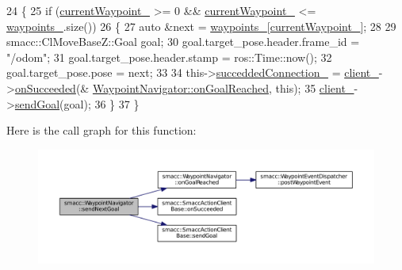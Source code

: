 \begin{DoxyCode}
24 \{
25   \textcolor{keywordflow}{if} (\hyperlink{classsmacc_1_1WaypointNavigator_a9a0102946593081338f7bd259f4670bc}{currentWaypoint\_} >= 0 && \hyperlink{classsmacc_1_1WaypointNavigator_a9a0102946593081338f7bd259f4670bc}{currentWaypoint\_} <= 
      \hyperlink{classsmacc_1_1WaypointNavigator_a59d691f2177430c407b8e27df07552e9}{waypoints\_}.size())
26   \{
27     \textcolor{keyword}{auto} &next = \hyperlink{classsmacc_1_1WaypointNavigator_a59d691f2177430c407b8e27df07552e9}{waypoints\_}[\hyperlink{classsmacc_1_1WaypointNavigator_a9a0102946593081338f7bd259f4670bc}{currentWaypoint\_}];
28 
29     smacc::ClMoveBaseZ::Goal goal;
30     goal.target\_pose.header.frame\_id = \textcolor{stringliteral}{"/odom"};
31     goal.target\_pose.header.stamp = ros::Time::now();
32     goal.target\_pose.pose = next;
33 
34     this->\hyperlink{classsmacc_1_1WaypointNavigator_a932d5378c3ef5bd4e8e3152ac657112f}{succeddedConnection\_} = \hyperlink{classsmacc_1_1WaypointNavigator_a2bdb0d4aea851d877fcb20e6d0897bb8}{client\_}->\hyperlink{classsmacc_1_1SmaccActionClientBase_ae84ce50f0bdd42c5d32a631b4e9b8b6a}{onSucceeded}(&
      \hyperlink{classsmacc_1_1WaypointNavigator_ae60d62eec927560048258a4b8f355506}{WaypointNavigator::onGoalReached}, \textcolor{keyword}{this});
35     \hyperlink{classsmacc_1_1WaypointNavigator_a2bdb0d4aea851d877fcb20e6d0897bb8}{client\_}->\hyperlink{classsmacc_1_1SmaccActionClientBase_a58c67a87c5fb8ea1633573c58fe3eee1}{sendGoal}(goal);
36   \}
37 \}
\end{DoxyCode}


Here is the call graph for this function\+:
\nopagebreak
\begin{figure}[H]
\begin{center}
\leavevmode
\includegraphics[width=350pt]{classsmacc_1_1WaypointNavigator_a127438f90a00e98628ebd64b4c84b0b7_cgraph}
\end{center}
\end{figure}


